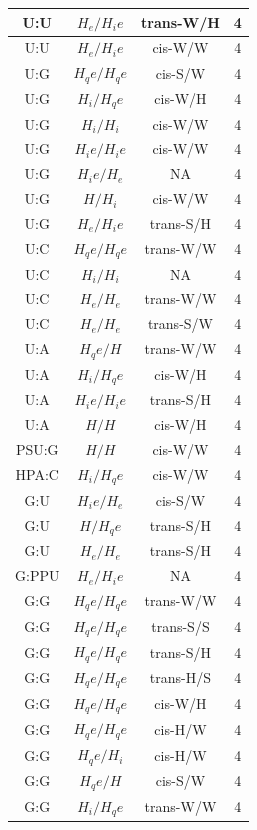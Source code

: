 \begin{center}
\begin{longtable}{c|c|c|c}
U:U & $H_e/H_ie$ & trans-W/H & 4 \\  \hline
U:U & $H_e/H_ie$ & cis-W/W & 4 \\  \hline
U:G & $H_qe/H_qe$ & cis-S/W & 4 \\  \hline
U:G & $H_i/H_qe$ & cis-W/H & 4 \\  \hline
U:G & $H_i/H_i$ & cis-W/W & 4 \\  \hline
U:G & $H_ie/H_ie$ & cis-W/W & 4 \\  \hline
U:G & $H_ie/H_e$ & NA & 4 \\  \hline
U:G & $H/H_i$ & cis-W/W & 4 \\  \hline
U:G & $H_e/H_ie$ & trans-S/H & 4 \\  \hline
U:C & $H_qe/H_qe$ & trans-W/W & 4 \\  \hline
U:C & $H_i/H_i$ & NA & 4 \\  \hline
U:C & $H_e/H_e$ & trans-W/W & 4 \\  \hline
U:C & $H_e/H_e$ & trans-S/W & 4 \\  \hline
U:A & $H_qe/H$ & trans-W/W & 4 \\  \hline
U:A & $H_i/H_qe$ & cis-W/H & 4 \\  \hline
U:A & $H_ie/H_ie$ & trans-S/H & 4 \\  \hline
U:A & $H/H$ & cis-W/H & 4 \\  \hline
PSU:G & $H/H$ & cis-W/W & 4 \\  \hline
HPA:C & $H_i/H_qe$ & cis-W/W & 4 \\  \hline
G:U & $H_ie/H_e$ & cis-S/W & 4 \\  \hline
G:U & $H/H_qe$ & trans-S/H & 4 \\  \hline
G:U & $H_e/H_e$ & trans-S/H & 4 \\  \hline
G:PPU & $H_e/H_ie$ & NA & 4 \\  \hline
G:G & $H_qe/H_qe$ & trans-W/W & 4 \\  \hline
G:G & $H_qe/H_qe$ & trans-S/S & 4 \\  \hline
G:G & $H_qe/H_qe$ & trans-S/H & 4 \\  \hline
G:G & $H_qe/H_qe$ & trans-H/S & 4 \\  \hline
G:G & $H_qe/H_qe$ & cis-W/H & 4 \\  \hline
G:G & $H_qe/H_qe$ & cis-H/W & 4 \\  \hline
G:G & $H_qe/H_i$ & cis-H/W & 4 \\  \hline
G:G & $H_qe/H$ & cis-S/W & 4 \\  \hline
G:G & $H_i/H_qe$ & trans-W/W & 4 \\  \hline

\end{longtable}
\end{center}
